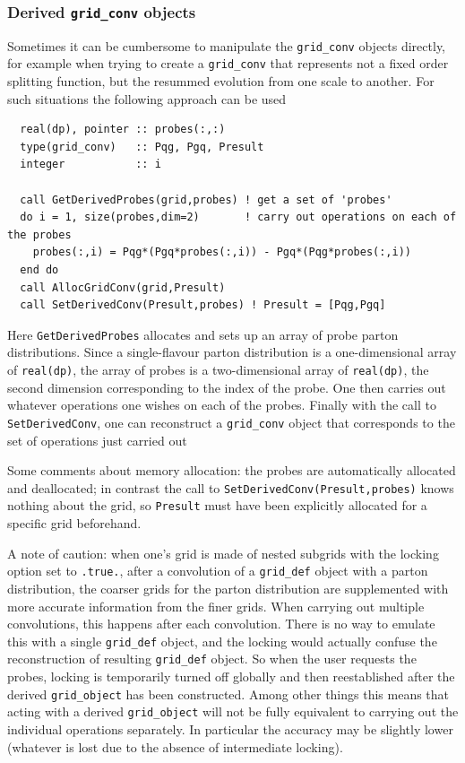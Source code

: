 \documentclass[12pt]{article}
\begin{document}
\subsubsection{Derived \texttt{grid\_conv} objects}
\label{sec:derived_grid_conv}

Sometimes it can be cumbersome to manipulate the \texttt{grid\_conv}
objects directly, for example when trying to create a
\texttt{grid\_conv} that represents not a fixed order splitting
function, but the resummed evolution from one scale to another. For
such situations the following approach can be used
\begin{lstlisting}
  real(dp), pointer :: probes(:,:)
  type(grid_conv)   :: Pqg, Pgq, Presult
  integer           :: i

  call GetDerivedProbes(grid,probes) ! get a set of 'probes'
  do i = 1, size(probes,dim=2)       ! carry out operations on each of the probes
    probes(:,i) = Pqg*(Pgq*probes(:,i)) - Pgq*(Pqg*probes(:,i))
  end do
  call AllocGridConv(grid,Presult)
  call SetDerivedConv(Presult,probes) ! Presult = [Pqg,Pgq]
\end{lstlisting}
Here \texttt{GetDerivedProbes} allocates and sets up an array of probe
parton distributions. Since a single-flavour parton distribution is a
one-dimensional array of \texttt{real(dp)}, the array of probes is a
two-dimensional array of \texttt{real(dp)}, the second dimension
corresponding to the index of the probe. One then carries out whatever
operations one wishes on each of the probes. Finally with the call to
\texttt{SetDerivedConv}, one can reconstruct a \texttt{grid\_conv}
object that corresponds to the set of operations just carried out

Some comments about memory allocation: the probes are automatically
allocated and deallocated; in contrast the call to
\texttt{SetDerivedConv(Presult,probes)} knows nothing about the grid,
so \texttt{Presult} must have been explicitly allocated for a specific
grid beforehand.

A note of caution: when one's grid is made of nested subgrids with the
locking option set to \texttt{.true.}, after a convolution of a
\texttt{grid\_def} object with a parton distribution, the coarser
grids for the parton distribution are supplemented with more accurate
information from the finer grids. When carrying out multiple
convolutions, this happens after each convolution.  There is no way to
emulate this with a single \texttt{grid\_def} object, and the locking
would actually confuse the reconstruction of resulting
\texttt{grid\_def} object. So when the user requests the probes,
locking is temporarily turned off globally and then reestablished
after the derived \texttt{grid\_object} has been constructed. Among
other things this means that acting with a derived
\texttt{grid\_object} will not be fully equivalent to carrying out the
individual operations separately. In particular the accuracy may be
slightly lower (whatever is lost due to the absence of intermediate
locking).
\end{document}
